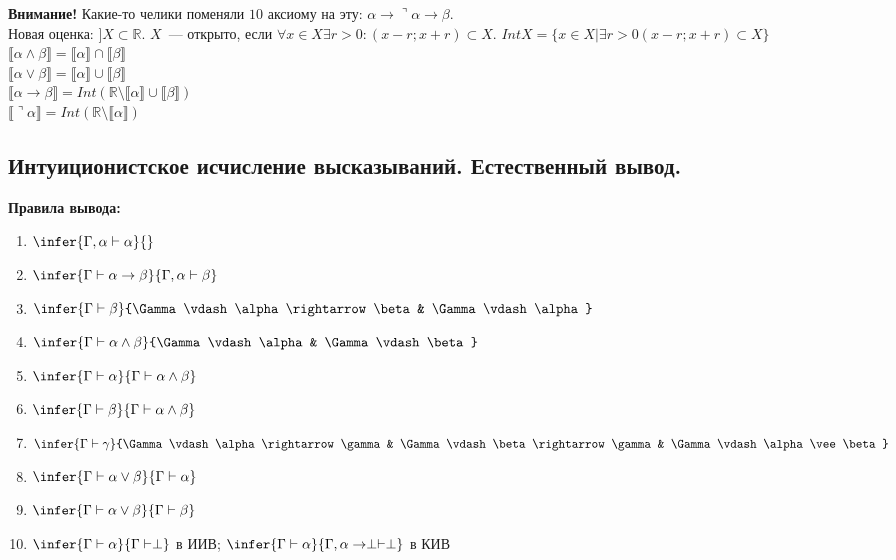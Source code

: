 \documentclass[12pt]{article}
\begin{document}
	\textbf{Внимание!} Какие-то челики поменяли $10$ аксиому на эту: $\alpha \rightarrow \urcorner \alpha \rightarrow \beta$. \\
	Новая оценка: $] X \subset \mathbb{R}$. $X$~--- открыто, если $\forall x \in X \exists r > 0: (x - r; x + r) \subset X$. $Int X = \{ x \in X | \exists r > 0 (x - r; x + r) \subset X \}$ \\
	$\llbracket \alpha \wedge \beta \rrbracket = \llbracket \alpha \rrbracket \cap \llbracket \beta \rrbracket$ \\
	$\llbracket \alpha \vee \beta \rrbracket = \llbracket \alpha \rrbracket \cup \llbracket \beta \rrbracket$ \\
	$\llbracket \alpha \rightarrow \beta \rrbracket = Int(\mathbb{R} \setminus \llbracket \alpha \rrbracket \cup \llbracket \beta \rrbracket)$ \\
	$\llbracket \urcorner \alpha \rrbracket = Int(\mathbb{R} \setminus \llbracket \alpha \rrbracket)$
	\subsection{Интуиционистское исчисление высказываний. Естественный вывод.}
	\textbf{Правила вывода:}
	\begin{enumerate}
		\item $\infer{\Gamma, \alpha \vdash \alpha}{}$
		\item $\infer{\Gamma \vdash \alpha \rightarrow \beta}{\Gamma, \alpha \vdash \beta}$
		\item $\infer{\Gamma \vdash \beta}{\Gamma \vdash \alpha \rightarrow \beta & \Gamma \vdash \alpha}$
		\item $\infer{\Gamma \vdash \alpha \wedge \beta}{\Gamma \vdash \alpha & \Gamma \vdash \beta}$
		\item $\infer{\Gamma \vdash \alpha}{\Gamma \vdash \alpha \wedge \beta}$
		\item $\infer{\Gamma \vdash \beta}{\Gamma \vdash \alpha \wedge \beta}$
		\item $\infer{\Gamma \vdash \gamma}{\Gamma \vdash \alpha \rightarrow \gamma & \Gamma \vdash \beta \rightarrow \gamma & \Gamma \vdash \alpha \vee \beta}$
		\item $\infer{\Gamma \vdash \alpha \vee \beta}{\Gamma \vdash \alpha}$
		\item $\infer{\Gamma \vdash \alpha \vee \beta}{\Gamma \vdash \beta}$
		\item $\infer{\Gamma \vdash \alpha}{\Gamma \vdash \perp}$ в ИИВ; $\infer{\Gamma \vdash \alpha}{\Gamma, \alpha \rightarrow \perp \vdash \perp}$ в КИВ
	\end{enumerate}
\end{document}
